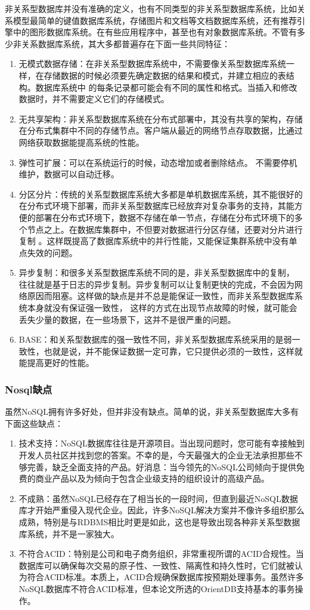 非关系型数据库并没有准确的定义，也有不同类型的非关系型数据库系统，比如关系模型最简单的键值数据库系统，存储图片和文档等文档数据库系统，还有推荐引擎中的图形数据库系统。在有些应用程序中，甚至也有对象数据库系统。不管有多少非关系数据库系统，其大多都普遍存在下面一些共同特征：
\begin{enumerate}[fullwidth,itemindent=2em]
	\item   无模式数据存储：在非关系型数据库系统中，不需要像关系型数据库系统一样，在存储数据的时候必须要先确定数据的结果和模式，并建立相应的表结构。数据库系统中
	的每条记录都可能会有不同的属性和格式。当插入和修改数据时，并不需要定义它们的存储模式。
\item 	无共享架构：非关系型数据库系统在分布式部署中，其没有共享的架构，存储在分布式集群中不同的存储节点。客户端从最近的网络节点存取数据，比通过网络获取数据能提高系统的性能。
\item 	弹性可扩展：可以在系统运行的时候，动态增加或者删除结点。
不需要停机维护，数据可以自动迁移。
\item 	分区分片：传统的关系型数据库系统大多都是单机数据库系统，其不能很好的在分布式环境下部署，而非关系型数据库已经放弃对复杂事务的支持，其能方便的部署在分布式环境下，数据不存储在单一节点，存储在分布式环境下的多个节点之上。在数据库集群中，不但要对数据进行分区存储，还要对分片进行复制
。这样既提高了数据库系统中的并行性能，又能保证集群系统中没有单点失效的问题。
\item 	异步复制：和很多关系型数据库系统不同的是，非关系型数据库中的复制，
往往就是基于日志的异步复制。异步复制可以让复制更快的完成，不会因为网络原因而阻塞。这样做的缺点是并不总是能保证一致性，而非关系型数据库系统本身就没有保证强一致性，
这样的方式在出现节点故障的时候，就可能会丢失少量的数据，在一些场景下，这并不是很严重的问题。
\item 	BASE：和关系型数据库的强一致性不同，非关系型数据库系统采用的是弱一致性，也就是说，并不能保证数据一定可靠，它只提供必须的一致性，这样就能提高更好的性能。
\end{enumerate}
\subsubsection{Nosql缺点}
虽然NoSQL拥有许多好处，但并非没有缺点。简单的说，非关系型数据库大多有下面这些缺点：
\begin{enumerate}
	\item 技术支持：NoSQL数据库往往是开源项目。当出现问题时，您可能有幸接触到开发人员社区并找到您的答案。不幸的是，今天最强大的企业无法承担那些不够完善，缺乏全面支持的产品。好消息：当今领先的NoSQL公司倾向于提供免费的商业产品以及为倾向于包含企业级支持的组织设计的高级产品。
\item 	不成熟：虽然NoSQL已经存在了相当长的一段时间，但直到最近NoSQL数据库才开始严重侵入现代企业。因此，许多NoSQL解决方案并不像许多组织那么成熟，特别是与RDBMS相比时更是如此，这也是导致出现各种非关系型数据库系统，并不是一家独大。
\item 	不符合ACID：特别是公司和电子商务组织，非常重视所谓的ACID合规性。当数据库可以确保每次交易的原子性、一致性、隔离性和持久性时，它们就被认为符合ACID标准。本质上，ACID合规确保数据库按预期处理事务。虽然许多NoSQL数据库不符合ACID标准，但本论文所选的OrientDB支持基本的事务操作。
\end{enumerate}


